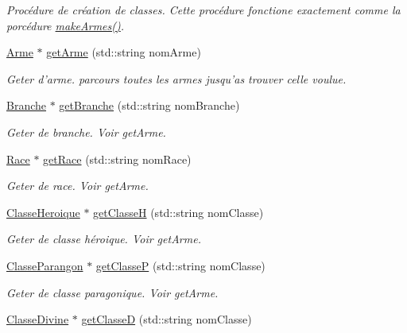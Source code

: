 \begin{DoxyCompactItemize}
\begin{DoxyCompactList}\small\item\em Procédure de création de classes. Cette procédure fonctione exactement comme la porcédure \hyperlink{classInstancieur_acfc970b91c26ac5c29320f9d5ca73ee4}{make\-Armes()}. \end{DoxyCompactList}\item 
\hyperlink{classArme}{Arme} $\ast$ \hyperlink{classInstancieur_a26963863eb1cd9f6a59c0b23dce288dd}{get\-Arme} (std\-::string nom\-Arme)
\begin{DoxyCompactList}\small\item\em Geter d'arme. parcours toutes les armes jusqu'as trouver celle voulue. \end{DoxyCompactList}\item 
\hyperlink{classBranche}{Branche} $\ast$ \hyperlink{classInstancieur_a1890b3ca394bc59c59ea07663bcc3a6d}{get\-Branche} (std\-::string nom\-Branche)
\begin{DoxyCompactList}\small\item\em Geter de branche. Voir get\-Arme. \end{DoxyCompactList}\item 
\hyperlink{classRace}{Race} $\ast$ \hyperlink{classInstancieur_a8fb2fe3684962eee073a99fd3dade04a}{get\-Race} (std\-::string nom\-Race)
\begin{DoxyCompactList}\small\item\em Geter de race. Voir get\-Arme. \end{DoxyCompactList}\item 
\hyperlink{classClasseHeroique}{Classe\-Heroique} $\ast$ \hyperlink{classInstancieur_aa1482aabc634adf6c964ab47c765e99e}{get\-Classe\-H} (std\-::string nom\-Classe)
\begin{DoxyCompactList}\small\item\em Geter de classe héroique. Voir get\-Arme. \end{DoxyCompactList}\item 
\hyperlink{classClasseParangon}{Classe\-Parangon} $\ast$ \hyperlink{classInstancieur_a438622a251deaf080808b472f16d4cba}{get\-Classe\-P} (std\-::string nom\-Classe)
\begin{DoxyCompactList}\small\item\em Geter de classe paragonique. Voir get\-Arme. \end{DoxyCompactList}\item 
\hyperlink{classClasseDivine}{Classe\-Divine} $\ast$ \hyperlink{classInstancieur_a49c846b763677d79dbc882df834e5a42}{get\-Classe\-D} (std\-::string nom\-Classe)

\end{DoxyCompactItemize}
